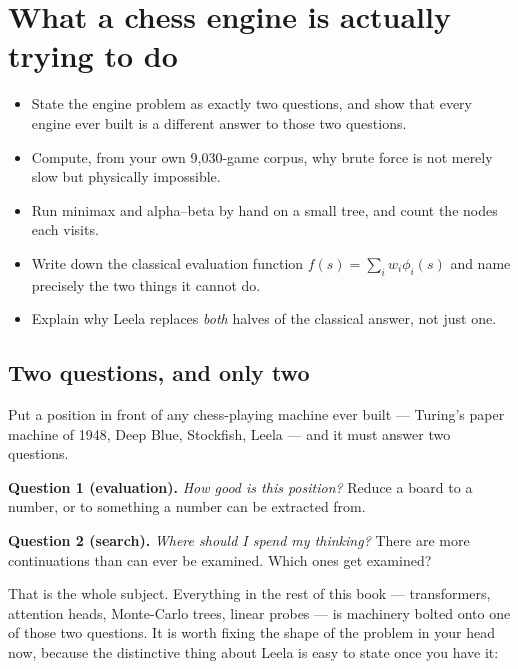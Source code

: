 \chapter{What a chess engine is actually trying to do}
\label{ch:problem}

\begin{objectives}
\begin{itemize}
\item State the engine problem as exactly two questions, and show that every engine ever
  built is a different answer to those two questions.
\item Compute, from your own 9{,}030-game corpus, why brute force is not merely slow but
  physically impossible.
\item Run minimax and alpha--beta by hand on a small tree, and count the nodes each visits.
\item Write down the classical evaluation function $f(s)=\sum_i w_i \phi_i(s)$ and name
  precisely the two things it cannot do.
\item Explain why Leela replaces \emph{both} halves of the classical answer, not just one.
\end{itemize}
\end{objectives}

\section{Two questions, and only two}

Put a position in front of any chess-playing machine ever built --- Turing's paper machine
of 1948, Deep Blue, Stockfish, Leela --- and it must answer two questions.

\begin{keyidea}
\textbf{Question 1 (evaluation).} \emph{How good is this position?} Reduce a board to a
number, or to something a number can be extracted from.

\medskip
\textbf{Question 2 (search).} \emph{Where should I spend my thinking?} There are more
continuations than can ever be examined. Which ones get examined?
\end{keyidea}

That is the whole subject. Everything in the rest of this book --- transformers, attention
heads, Monte-Carlo trees, linear probes --- is machinery bolted onto one of those two
questions. It is worth fixing the shape of the problem in your head now, because the
distinctive thing about Leela is easy to state once you have it:

